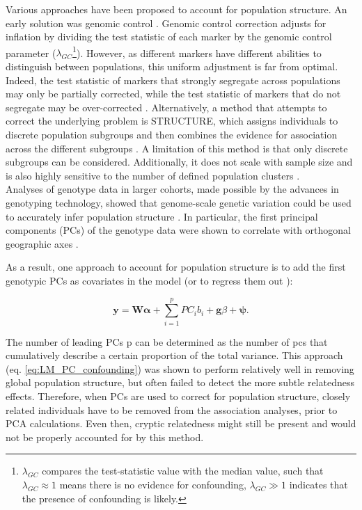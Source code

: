 Various approaches have been proposed to account for population structure.
An early solution was genomic control \cite{devlin1999genomic}.
Genomic control correction adjusts for inflation by dividing the test statistic of each marker by the genomic control parameter ($\lambda_{GC}$\footnote{$\lambda_{GC}$ compares the test-statistic value with the median value, such that $\lambda_{GC} \approx 1$ means there is no evidence for confounding, $\lambda_{GC} \gg 1$ indicates that the presence of confounding is likely.}). 
However, as different markers have different abilities to distinguish between populations, this uniform adjustment is far from optimal. 
Indeed, the test statistic of markers that strongly segregate across populations may only be partially corrected, while the test statistic of markers that do not segregate may be over-corrected \cite{marchini2004effects, price2006principal}.
Alternatively, a method that attempts to correct the underlying problem is STRUCTURE, which assigns individuals to discrete population subgroups and then combines the evidence for association across the different subgroups \cite{pritchard2000inference}. 
A limitation of this method is that only discrete subgroups can be considered. 
Additionally, it does not scale with sample size and is also highly sensitive to the number of defined population clusters \cite{price2006principal}.\\

Analyses of genotype data in larger cohorts, made possible by the advances in
genotyping technology, showed that genome-scale genetic variation could be used to
accurately infer population structure 
\cite{li2008worldwide, tian2008analysis, price2008discerning}.
In particular, the first principal components (PCs) of the genotype data were shown to correlate with orthogonal geographic axes
\cite{novembre2008interpreting}.

As a result, one approach to account for population structure is to add the first genotypic PCs as covariates in the model (or to regress them out \cite{price2006principal}): 

\begin{equation}\label{eq:LM_PC_confounding}
    \mathbf{y} =  \mathbf{W}\boldsymbol{\alpha} + \sum_{i=1}^{p} PC_i b_i + \mathbf{g}\beta + \boldsymbol{\psi}. 
\end{equation}

The number of leading PCs p can be determined as the number of \gls{pc}s that cumulatively describe a certain proportion of the total variance.
This approach (eq. \eqref{eq:LM_PC_confounding}) was shown to perform relatively well in removing global population structure, but often failed to detect the more subtle relatedness effects.
Therefore, when PCs are used to correct for population structure, closely related individuals have to be removed from the association analyses, prior to PCA calculations.
Even then, cryptic relatedness might still be present and would not be properly accounted for by this method. 

